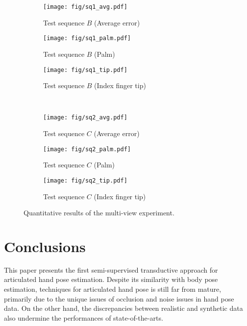 \begin{figure*}[ht]
	\centering
	\begin{subfigure}{0.34\linewidth}
		\centering \texttt{[image: fig/sq1\_avg.pdf]}
		\caption{Test sequence $B$ (Average error)}
	\end{subfigure}
	\begin{subfigure}{0.32\linewidth}
		\centering \texttt{[image: fig/sq1\_palm.pdf]}
		\caption{Test sequence $B$ (Palm)}
	\end{subfigure}
	\begin{subfigure}{0.32\linewidth}
		\centering \texttt{[image: fig/sq1\_tip.pdf]}
		\caption{Test sequence $B$ (Index finger tip)}
		\label{fig:experiments:multiview:quant:c}
	\end{subfigure} \\ \vspace{-1mm}
	\begin{subfigure}{0.34\linewidth}
		\centering \texttt{[image: fig/sq2\_avg.pdf]}
		\caption{Test sequence $C$ (Average error)}
	\end{subfigure}
	\begin{subfigure}{0.32\linewidth}
		\centering \texttt{[image: fig/sq2\_palm.pdf]}
		\caption{Test sequence $C$ (Palm)}
	\end{subfigure}
	\begin{subfigure}{0.32\linewidth}
		\centering \texttt{[image: fig/sq2\_tip.pdf]}
		\caption{Test sequence $C$ (Index finger tip)}
	\end{subfigure} 
	\caption{Quantitative results of the multi-view experiment.}
	\label{fig:experiments:multiview:quant}
\end{figure*}

 

\section{Conclusions}

This paper presents the first semi-supervised transductive approach for articulated hand pose estimation.  
Despite its similarity with body pose estimation, techniques for articulated hand pose is still far from mature, primarily due to the unique issues of occlusion and noise issues in hand pose data. 
On the other hand, the discrepancies between realistic and synthetic data also undermine the performances of state-of-the-arts. 

